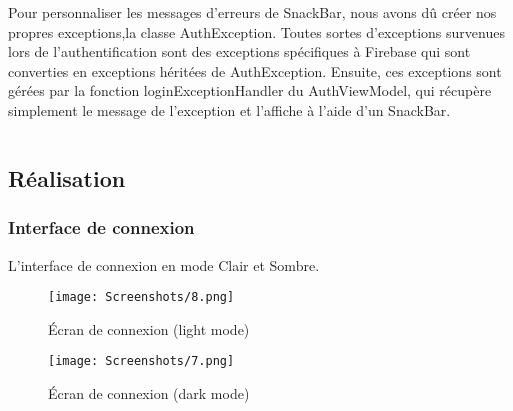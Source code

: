 Pour personnaliser les messages d'erreurs de SnackBar, nous avons dû créer nos propres exceptions,la classe AuthException. Toutes sortes d'exceptions survenues lors de l'authentification sont des exceptions spécifiques à Firebase qui sont converties en exceptions héritées de AuthException. Ensuite, ces exceptions sont gérées par la fonction loginExceptionHandler du AuthViewModel, qui récupère simplement le message de l'exception et l'affiche à l'aide d'un SnackBar.

$ $
\vfill
\newpage
\subsection{Réalisation}
\subsubsection{Interface de connexion}
L'interface de connexion en mode Clair et Sombre.
\begin{figure}[!htbp]
  \begin{minipage}[t]{0.4\textwidth}    %
          \texttt{[image: Screenshots/8.png]}
          \caption{ Écran de connexion (light mode)}
  \end{minipage}%
    \begin{minipage}{0.20\textwidth}
      \hfill
    \end{minipage}
  \begin{minipage}[t]{0.4\textwidth}
          \texttt{[image: Screenshots/7.png]}
          \caption{ Écran de connexion (dark mode)}
  \end{minipage}%
  \end{figure}
  \hfill
  $ $
